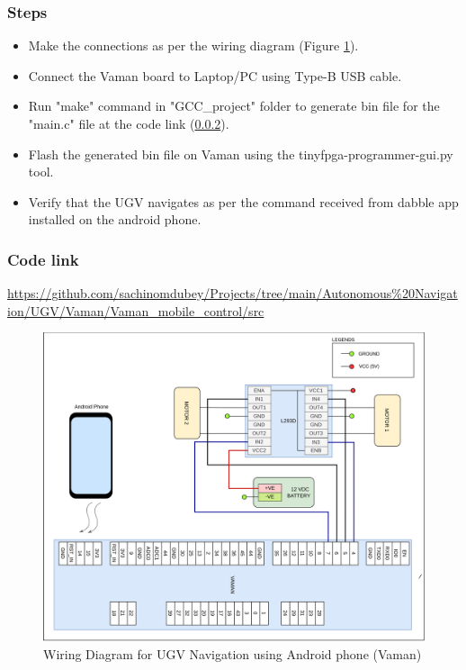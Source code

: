 \subsubsection{Steps}
\begin{itemize}
    \item Make the connections as per the wiring diagram (Figure \ref{Wiring_UGV_phone_vaman}).
    \item Connect the Vaman board to Laptop/PC using Type-B USB cable.
    \item Run "make" command in "GCC\_project" folder to generate bin file for the "main.c" file at the code link (\ref{Code_link_UGV_phone_vaman}).
    \item Flash the generated bin file on Vaman using the tinyfpga-programmer-gui.py tool. 
    \item Verify that the UGV navigates as per the command received from dabble app installed on the android phone.
\end{itemize}

\subsubsection{{Code link}}\label{Code_link_UGV_phone_vaman}
\begin{tcolorbox}
\url{https://github.com/sachinomdubey/Projects/tree/main/Autonomous\%20Navigation/UGV/Vaman/Vaman_mobile_control/src}
\end{tcolorbox}

\begin{figure}[h!]
\centering
\includegraphics[width=\columnwidth]{./Figures/Wiring_UGV_phone_vaman.png}
\caption{Wiring Diagram for UGV Navigation using Android phone (Vaman)}
\label{Wiring_UGV_phone_vaman}
\end{figure}

